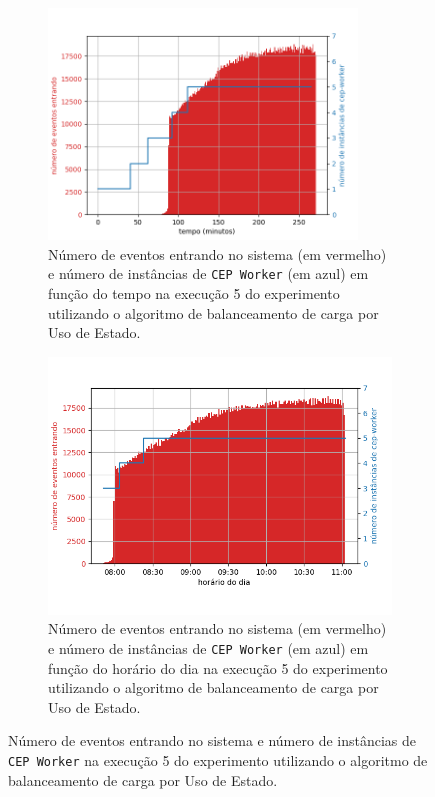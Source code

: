 \begin{figure}[h]
\centering
\begin{subfigure}{\textwidth}
\centering
\includegraphics[width=0.9\textwidth]{figuras/graphics/carga_e_workers_total10-dez-su.png}
\caption{Número de eventos entrando no sistema (em vermelho) e número de instâncias de \texttt{CEP Worker} (em azul) em função do tempo na execução 5 do experimento utilizando o algoritmo de balanceamento de carga por Uso de Estado.}
\label{fig:workers_and_load_total_10-dez-su}
\end{subfigure}%

\begin{subfigure}{\textwidth}
\centering
\includegraphics[width=\textwidth]{figuras/graphics/carga_e_workers_horario10-dez-su.png}
\caption{Número de eventos entrando no sistema (em vermelho) e número de instâncias de \texttt{CEP Worker} (em azul) em função do horário do dia na execução 5 do experimento utilizando o algoritmo de balanceamento de carga por Uso de Estado.}
\label{fig:workers_and_load_SPtrans_10-dez-su}
\end{subfigure}%
\caption{Número de eventos entrando no sistema e número de instâncias de \texttt{CEP Worker} na execução 5 do experimento utilizando o algoritmo de balanceamento de carga por Uso de Estado.}
\end{figure}



